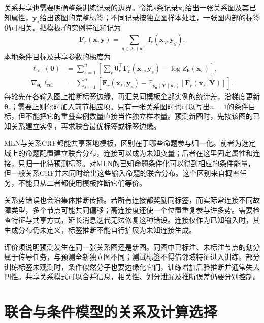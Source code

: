 关系共享也需要明确整条训练记录的边界。令第$s$条记录$\bm{x}_s$给出一张关系图及其已知属性，$\bm{y}_s$给出该图的完整标签；不同记录按独立图样本处理，一张图内部的标签仍可相关。把模板$r$的实例特征和记为
\[
  \bm{F}_r(\bm{x},\bm{y})
    =\sum_{g\in\mathcal{I}_r(\bm{x})}
                  \bm{f}_r(\bm{x}_g,\bm{y}_g).
\]
本地条件目标及共享参数的梯度为
\begin{equation}
  \begin{aligned}
    \ell_{\mathrm{rel}}(\bm{\theta})
      &=\sum_{s=1}^n\left[
           \sum_r\bm{\theta}_r^\top\bm{F}_r(\bm{x}_s,\bm{y}_s)
           -\log Z_{\bm{\theta}}(\bm{x}_s)\right],\\
    \nabla_{\bm{\theta}_r}\ell_{\mathrm{rel}}
      &=\sum_{s=1}^n\left[
          \bm{F}_r(\bm{x}_s,\bm{y}_s)
          -\mathbb{E}_{p_{\bm{\theta}}(\bm{Y}\mid\bm{x}_s)}
                        [\bm{F}_r(\bm{x}_s,\bm{Y})]\right].
  \end{aligned}
  \label{eq:pgm-energy-models-relational-learning}
\end{equation}
每轮先在各输入图上推断标签边缘，再汇总同模板全部实例的统计差，沿梯度更新$\bm{\theta}_r$；需要正则化时加入前节相应项。只有一张关系图时也可以写出$n=1$的条件目标，但不能把它的重叠实例数量直接当作独立样本量。预测新图时，先按该图的已知关系建立实例，再求联合最优标签或标签边缘。

MLN与关系CRF都能共享落地模板，区别在于哪些命题参与归一化。前者为选定域上的命题配置建立联合分布，连接可以成为未知变量；后者在这里固定属性和连接，只归一化待预测标签。对MLN的已知命题条件化可以得到相应的条件能量，但一般关系CRF并未同时给出这些输入命题的联合分布。这个区别来自概率任务，不能只从二者都使用模板推断它们等价。

关系势错误也会沿集体推断传播。若所有连接都奖励同标签，而实际常连接不同故障类型，多个节点可能共同偏移；高连接度还使一个位置重复参与许多势。需要检查特征与共享方式，延长消息迭代无法修复这种错设。连接仅作为已知输入时，其生成分布仍未定义，标签推断不能自行扩展为未知连接生成。

评价须说明预测发生在同一张关系图还是新图。同图中已标注、未标注节点的划分属于传导任务，与预测全新独立图不同；测试标签不得借邻域特征进入训练。部分训练标签未观测时，条件似然分子也要边缘化它们，训练增加后验推断并通常失去凹性。共享关系模式可以合并信息，相关性、划分泄漏及推断误差仍要分别控制。

\section{联合与条件模型的关系及计算选择}
\label{sec:pgm-energy-models-comparison}

